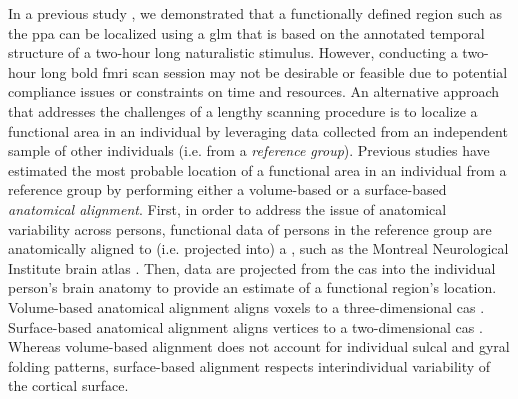 In a previous study \citep{haeusler2022processing}, we demonstrated that a
functionally defined region such as the \ac{ppa} can be localized using  a
\acf{glm} that is based on the annotated temporal structure of a two-hour long
naturalistic stimulus.
However, conducting a two-hour long \ac{bold} \ac{fmri} scan session may not be
desirable or feasible due to potential compliance issues or constraints on time
and resources.
An alternative approach that addresses the challenges of a lengthy scanning
procedure is to localize a functional area in an individual by leveraging data
collected from an independent sample of other individuals (i.e.  from a
\textit{reference group}).
Previous studies have estimated the most probable location of a functional area
in an individual from a reference group by performing either a volume-based
\citep{zhen2017quantifying, zhen2015quantifying} or a surface-based
\citep{frost2012measuring, weiner2018defining, rosenke2021probabilistic,
wang2015probabilistic} \textit{anatomical alignment}.
%
First, in order to address the issue of anatomical variability across persons,
functional data of persons in the reference group are anatomically aligned to
(i.e.  projected into) a , such as the Montreal Neurological Institute
brain atlas \citep[MNI152 atlas;][]{fonov2011unbiased}.
Then, data are projected from the \ac{cas} into the individual person's
brain anatomy to provide an estimate of a functional region's location.
Volume-based anatomical alignment \citep[s.][for a review]{klein2009evaluation}
aligns voxels to a three-dimensional \ac{cas} \citep[e.g., MNI152
atlas;][]{fonov2011unbiased}.
Surface-based anatomical alignment \citep{fischl1999cortical, yeo2009spherical}
aligns vertices to a two-dimensional \ac{cas} \citep[e.g., FreeSurfer's
fsaverage template;][]{fischl1999high}.
Whereas volume-based alignment does not account for individual sulcal and gyral
folding patterns, surface-based alignment respects interindividual variability
of the cortical surface.
